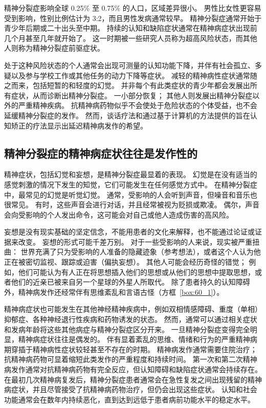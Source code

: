 精神分裂症影响全球 0.25\% 至 0.75\% 的人口，区域差异很小。
男性比女性更容易受到影响，性别比例估计为 3:2，而且男性发病通常较早。
精神分裂症通常开始于青少年后期或二十出头至中期。
持续的认知和缺陷症状通常在精神病症状出现前几个月甚至几年就开始了。
这一时期被一些研究人员称为超高风险状态，而其他人则称为精神分裂症前驱症状。


处于这种风险状态的个人通常会出现可测量的认知功能下降，并伴有社会孤立、多疑以及参与学校工作或其他任务的动力下降等症状。
减轻的精神病性症状通常随之而来，包括短暂的和轻度的幻觉。
并非每个有此类症状的青少年都会发展出所有症状，从而诊断出精神分裂症。
一小部分恢复；
其他人则发展出精神分裂症以外的严重精神疾病。
抗精神病药物似乎不会使处于危险状态的个体受益，也不会延缓精神分裂症的发作。
然而，谈话疗法和通过基于计算机的方法提供的旨在认知矫正的疗法显示出延迟精神病发作的希望。



\subsection{精神分裂症的精神病症状往往是发作性的}

精神症状，包括幻觉和妄想，是精神分裂症最显着的表现。
幻觉是在没有适当的感觉刺激的情况下发生的知觉，它们可能发生在任何感觉方式中。
在精神分裂症中，最常见的幻觉是听觉幻觉。
通常，受影响的人会听到声音，但噪音和音乐也很常见。
有时，这些声音会进行对话，并且经常被视为贬损或欺凌。
偶尔，声音会向受影响的个人发出命令，这可能会对自己或他人造成伤害的高风险。


妄想是没有现实基础的坚定信念，不能用患者的文化来解释，也不能通过论证或证据来改变。
妄想的形式可能千差万别。 对于一些受影响的人来说，现实被严重扭曲：
世界充满了只为受影响的人准备的隐藏迹象（参考想法），或者这个人认为他正在被密切监视、跟踪或迫害（偏执妄想）。
其他人可能会经历奇怪的错觉；
例如，他们可能认为有人正在将思想插入他们的思想或从他们的思想中提取思想，或者他们的近亲已被来自另一个星球的外星人所取代。
除了患者持久的认知障碍外，精神病发作还经常伴有思维紊乱和言语古怪（方框~\ref{box:60_1}）。


精神病症状也可能发生在其他神经精神疾病中，例如双相情感障碍、重度（单相）抑郁症、各种神经退行性疾病和药物诱发的状态。
然而，通常可以通过相关症状和发病年龄将这些其他病症与精神分裂症区分开来。
一旦精神分裂症变得完全明显，精神病症状往往是偶发的。
伴有显着紊乱的思维、情绪和行为的严重精神病期穿插于精神病性症状较轻甚至不存在的时期。
精神病发作通常需要住院治疗；
抗精神病药物可显着缩短此类发作的严重程度和持续时间。
第一次和第二次精神病发作通常对抗精神病药物有完全反应，但认知障碍和缺陷症状通常会持续存在。
在最初几次精神病复发后，精神分裂症患者通常会在急性复发之间出现残留的精神病症状，并且尽管接受了抗精神病药物治疗，但仍会出现这些症状。
认知和社会功能通常会在数年内持续恶化，直到达到远低于患者病前功能水平的稳定水平。



